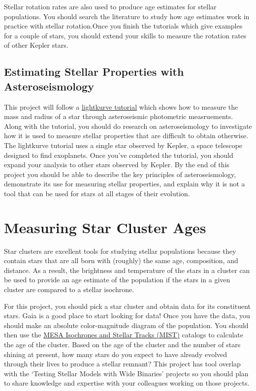 \documentclass[10pt]{extarticle}
\begin{document}
Stellar rotation rates are also used to produce age estimates for stellar
populations. You should search the literature to study how age estimates work in
practice with stellar rotation.Once you finish the tutorials which give examples
for a couple of stars, you should extend your skills to measure the rotation
rates of other Kepler stars. 


\subsection{Estimating Stellar Properties with Asteroseismology}
This project will follow a
\href{https://docs.lightkurve.org/tutorials/3-science-examples/asteroseismology-estimating-mass-and-radius.html}{lightkurve
tutorial} which shows how to measure the mass and radius of a star through
asteroseismic photometric measruements. Along with the tutorial, you should do
research on asteroseismology to investigate how it is used to measure stellar
properties that are difficult to obtain otherwise. The lightkurve tutorial uses
a single star observed by Kepler, a space telescope designed to find exoplanets.
Once you've completed the tutorial, you should expand your analysis to other
stars observed by Kepler. By the end of this project you should be able to
describe the key principles of asteroseismology, demonstrate its use for
measuring stellar properties, and explain why it is not a tool that can be used
for stars at all stages of their evolution.  


\section{Measuring Star Cluster Ages}
Star clusters are excellent tools for studying stellar populations because they
contain stars that are all born with (roughly) the same age, composition, and
distance. As a result, the brightness and temperature of the stars in a cluster
can be used to provide an age estimate of the population if the stars in a given
cluster are compared to a stellar isochrone. 

For this project, you should pick a star cluster and obtain data for its
constituent stars. Gaia is a good place to start looking for data! Once you have
the data, you should make an absolute color-magnitude diagram of the population.
You should then use the \href{https://waps.cfa.harvard.edu/MIST/}{MESA
Isochrones and Stellar Tracks (MIST)} catalogs to calculate the age of the
cluster. Based on the age of the cluster and the number of stars shining at
present, how many stars do you expect to have already evolved through their
lives to produce a stellar remnant? This project has tool overlap with the
`Testing Stellar Models with Wide Binaries' projects so you should plan to share
knowledge and expertise with your colleagues working on those projects. 
\end{document}
